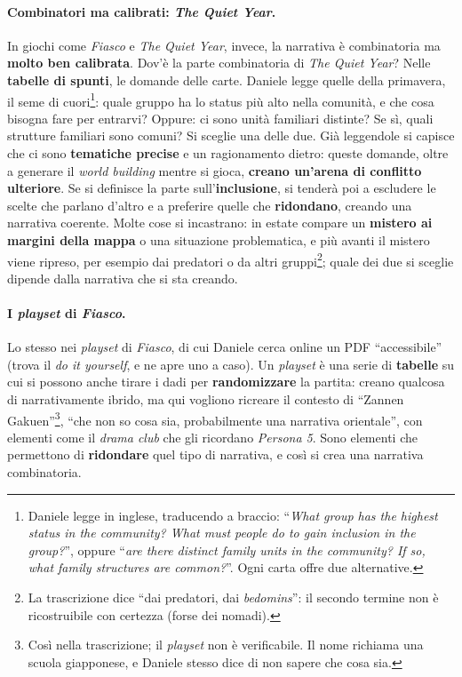 \paragraph{Combinatori ma calibrati: \emph{The Quiet Year}.} In giochi come \emph{Fiasco} e
\emph{The Quiet Year}, invece, la narrativa è combinatoria ma \textbf{molto ben calibrata}. Dov'è la
parte combinatoria di \emph{The Quiet Year}? Nelle \textbf{tabelle di spunti}, le domande delle
carte. Daniele legge quelle della primavera, il seme di cuori\footnote{Daniele legge in inglese,
traducendo a braccio: ``\emph{What group has the highest status in the community? What must people
do to gain inclusion in the group?}'', oppure ``\emph{are there distinct family units in the
community? If so, what family structures are common?}''. Ogni carta offre due alternative.}: quale
gruppo ha lo status più alto nella comunità, e che cosa bisogna fare per entrarvi? Oppure: ci sono
unità familiari distinte? Se sì, quali strutture familiari sono comuni? Si sceglie una delle due.
Già leggendole si capisce che ci sono \textbf{tematiche precise} e un ragionamento dietro: queste
domande, oltre a generare il \emph{world building} mentre si gioca, \textbf{creano un'arena di
conflitto ulteriore}. Se si definisce la parte sull'\textbf{inclusione}, si tenderà poi a escludere
le scelte che parlano d'altro e a preferire quelle che \textbf{ridondano}, creando una narrativa
coerente. Molte cose si incastrano: in estate compare un \textbf{mistero ai margini della mappa} o
una situazione problematica, e più avanti il mistero viene ripreso, per esempio dai predatori o da
altri gruppi\footnote{La trascrizione dice ``dai predatori, dai \emph{bedomins}'': il secondo termine
non è ricostruibile con certezza (forse dei nomadi).}; quale dei due si sceglie dipende dalla
narrativa che si sta creando.

\paragraph{I \emph{playset} di \emph{Fiasco}.} Lo stesso nei \emph{playset} di \emph{Fiasco}, di cui
Daniele cerca online un PDF ``accessibile'' (trova il \emph{do it yourself}, e ne apre uno a caso). Un
\emph{playset} è una serie di \textbf{tabelle} su cui si possono anche tirare i dadi per
\textbf{randomizzare} la partita: creano qualcosa di narrativamente ibrido, ma qui vogliono ricreare il
contesto di ``Zannen Gakuen''\footnote{Così nella trascrizione; il \emph{playset} non è verificabile.
Il nome richiama una scuola giapponese, e Daniele stesso dice di non sapere che cosa sia.}, ``che non
so cosa sia, probabilmente una narrativa orientale'', con elementi come il \emph{drama club} che gli
ricordano \emph{Persona 5}. Sono elementi che permettono di \textbf{ridondare} quel tipo di
narrativa, e così si crea una narrativa combinatoria.

